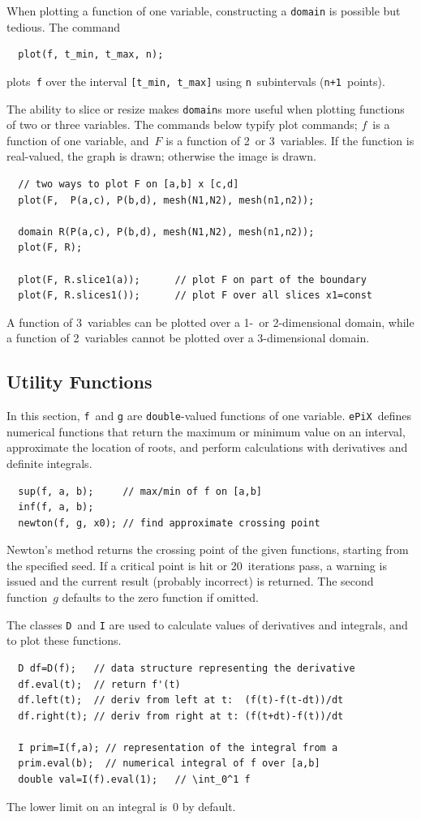 \documentclass[12pt]{report}
\newcommand{\code}[1]{\texttt{#1}}
\newcommand{\ePiX}{\code{ePiX}}
\begin{document}
When plotting a function of one variable, constructing a \code{domain}
is possible but tedious.  The command
\begin{verbatim}
  plot(f, t_min, t_max, n);
\end{verbatim}
plots~\code{f} over the interval \code{[t\_min, t\_max]} using
\code{n}~subintervals (\code{n+1}~points).

The ability to slice or resize makes \code{domain}s more useful when
plotting functions of two or three variables.  The commands below
typify plot commands; $f$~is a function of one variable, and~$F$ is a
function of 2~or 3~variables. If the function is real-valued, the
graph is drawn; otherwise the image is drawn.
\begin{verbatim}
  // two ways to plot F on [a,b] x [c,d]
  plot(F,  P(a,c), P(b,d), mesh(N1,N2), mesh(n1,n2));

  domain R(P(a,c), P(b,d), mesh(N1,N2), mesh(n1,n2));
  plot(F, R);

  plot(F, R.slice1(a));      // plot F on part of the boundary
  plot(F, R.slices1());      // plot F over all slices x1=const
\end{verbatim}
A function of 3~variables can be plotted over a 1-~or 2-dimensional
domain, while a function of 2~variables cannot be plotted over a
3-dimensional domain.


\subsection*{Utility Functions}

In this section, \code{f}~and \code{g} are \code{double}-valued
functions of one variable. \ePiX\ defines numerical functions that
return the maximum or minimum value on an interval, approximate the
location of roots, and perform calculations with derivatives and
definite integrals.
\begin{verbatim}
  sup(f, a, b);     // max/min of f on [a,b]
  inf(f, a, b);
  newton(f, g, x0); // find approximate crossing point
\end{verbatim}
Newton's method returns the crossing point of the given functions,
starting from the specified seed. If a critical point is hit or
20~iterations pass, a warning is issued and the current result
(probably incorrect) is returned. The second function~$g$ defaults to
the zero function if omitted. 

The classes \code{D}~and \code{I} are used to calculate values of
derivatives and integrals, and to plot these functions.
\begin{verbatim}
  D df=D(f);   // data structure representing the derivative
  df.eval(t);  // return f'(t)
  df.left(t);  // deriv from left at t:  (f(t)-f(t-dt))/dt
  df.right(t); // deriv from right at t: (f(t+dt)-f(t))/dt

  I prim=I(f,a); // representation of the integral from a
  prim.eval(b);  // numerical integral of f over [a,b]
  double val=I(f).eval(1);   // \int_0^1 f
\end{verbatim}
The lower limit on an integral is~0 by default.
\end{document}
